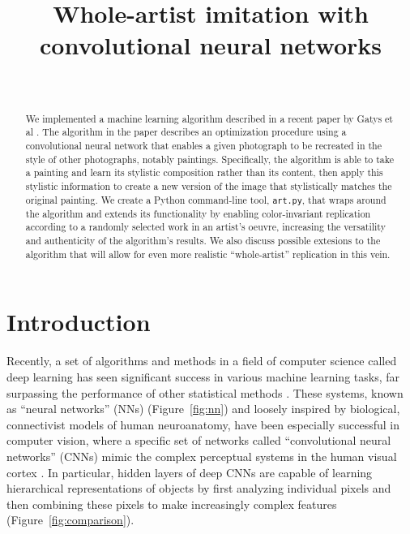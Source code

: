 \documentclass[11pt,letterpaper,journal]{IEEEtran}
\begin{document}

\title{Whole-artist imitation with convolutional neural networks}
\author{\\
}
\maketitle

\begin{abstract}
We implemented a machine learning algorithm described in a recent paper by
Gatys et al \cite{gatys15}. The algorithm in the paper describes an
optimization procedure using a convolutional neural network that enables a
given photograph to be recreated in the style of other photographs, notably
paintings. Specifically, the algorithm is able to take a painting and learn its
stylistic composition rather than its content, then apply this stylistic
information to create a new version of the image that stylistically matches the
original painting. We create a Python command-line tool, \texttt{art.py}, that
wraps around the algorithm and extends its functionality by enabling
color-invariant replication according to a randomly selected work in an
artist's oeuvre, increasing the versatility and authenticity of the algorithm's
results. We also discuss possible extesions to the algorithm that will allow
for even more realistic ``whole-artist'' replication in this vein.
\end{abstract}

\section{Introduction}

Recently, a set of algorithms and methods in a field of computer science called
deep learning has seen significant success in various machine learning tasks,
far surpassing the performance of other statistical methods \cite{lecun2015}.
These systems, known as ``neural networks'' (NNs) (Figure~\ref{fig:nn}) and
loosely inspired by biological, connectivist models of human neuroanatomy, have
been especially successful in computer vision, where a specific set of networks
called ``convolutional neural networks'' (CNNs) mimic the complex perceptual
systems in the human visual cortex \cite{riesenhuber99}. In particular, hidden
layers of deep CNNs are capable of learning hierarchical representations of
objects by first analyzing individual pixels and then combining these pixels to
make increasingly complex features (Figure~\ref{fig:comparison}).
\end{document}
